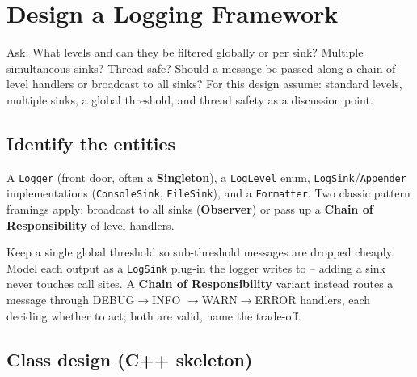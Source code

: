 \section{Design a Logging Framework}
\label{sec:case-logger}


\begin{patternbox}
Ask: What levels and can they be filtered globally or per sink? Multiple
simultaneous sinks? Thread-safe? Should a message be passed along a chain
of level handlers or broadcast to all sinks? For this design assume:
standard levels, multiple sinks, a global threshold, and thread safety as
a discussion point.
\end{patternbox}

\subsection*{Identify the entities}

A \texttt{Logger} (front door, often a \textbf{Singleton}), a
\texttt{LogLevel} enum, \texttt{LogSink}/\texttt{Appender} implementations
(\texttt{ConsoleSink}, \texttt{FileSink}), and a \texttt{Formatter}. Two
classic pattern framings apply: broadcast to all sinks (\textbf{Observer})
or pass up a \textbf{Chain of Responsibility} of level handlers.

\begin{ideabox}
Keep a single global threshold so sub-threshold messages are dropped
cheaply. Model each output as a \texttt{LogSink} plug-in the logger writes
to -- adding a sink never touches call sites. A \textbf{Chain of
Responsibility} variant instead routes a message through DEBUG$\to$INFO
$\to$WARN$\to$ERROR handlers, each deciding whether to act; both are valid,
name the trade-off.
\end{ideabox}

\subsection*{Class design (C++ skeleton)}


